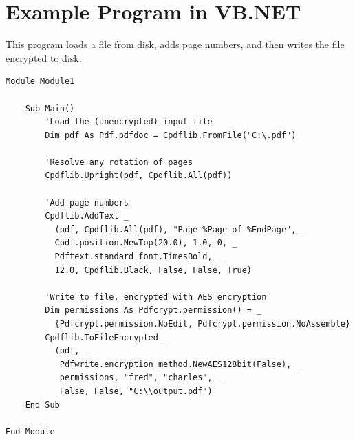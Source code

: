 \documentclass[a4paper]{memoir}
\begin{document}
\chapter{Example Program in VB.NET}
This program loads a file from disk, adds page numbers, and then writes the file encrypted to disk.
\begin{small}
\begin{verbatim}
Module Module1

    Sub Main()
        'Load the (unencrypted) input file
        Dim pdf As Pdf.pdfdoc = Cpdflib.FromFile("C:\.pdf")

        'Resolve any rotation of pages
        Cpdflib.Upright(pdf, Cpdflib.All(pdf))

        'Add page numbers
        Cpdflib.AddText _
          (pdf, Cpdflib.All(pdf), "Page %Page of %EndPage", _
          Cpdf.position.NewTop(20.0), 1.0, 0, _
          Pdftext.standard_font.TimesBold, _
          12.0, Cpdflib.Black, False, False, True)

        'Write to file, encrypted with AES encryption
        Dim permissions As Pdfcrypt.permission() = _
          {Pdfcrypt.permission.NoEdit, Pdfcrypt.permission.NoAssemble}
        Cpdflib.ToFileEncrypted _
          (pdf, _
           Pdfwrite.encryption_method.NewAES128bit(False), _
           permissions, "fred", "charles", _
           False, False, "C:\\output.pdf")
    End Sub

End Module
\end{verbatim}
\end{small}

\backmatter
\printindex
\end{document}
